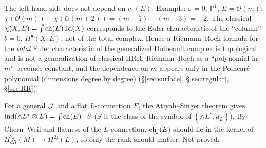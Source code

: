 \begin{rem}[Meaning \tP]\label{rem:Emeaning}
The left-hand side does not depend on $c_1(E)$. Example: $\sigma=0$, $\mathbb P^1$, $E=\mathcal O(m)$: $\chi(\mathcal O(m))-\chi(\mathcal O(m+2))=(m+1)-(m+3)=-2$. The classical $\chi(X,E)=\int\mathrm{ch}(E)\mathrm{Td}(X)$ corresponds to the Euler characteristic of the ``column'' $b=0$, $H^\bullet(X,E)$, not of the total complex. Hence a Riemann--Roch formula for the \emph{total} Euler characteristic of the generalized Dolbeault complex is topological and is not a generalization of classical HRR. Riemann--Roch as a ``polynomial in $m$'' becomes constant, and the dependence on $m$ appears only in the Poincar\'e polynomial (dimensions degree by degree) (\S\ref{sec:surface}, \S\ref{sec:regular}, \S\ref{sec:RR}).
\end{rem}
\begin{rem}
For a general $\mathcal J$ and a flat $L$-connection $E$, the Atiyah--Singer theorem gives $\mathrm{ind}(\wedge L^*\otimes E)=\int\mathrm{ch}(E)\cdot S$ ($S$ is the class of the symbol of $(\wedge L^*,d_L)$). By Chern--Weil and flatness of the $L$-connection, $\mathrm{ch}_j(E)$ should lie in the kernel of $H^{2j}_{dR}(M)\to H^{2j}(L)$, so only the rank should matter. Not proved.
\end{rem}

